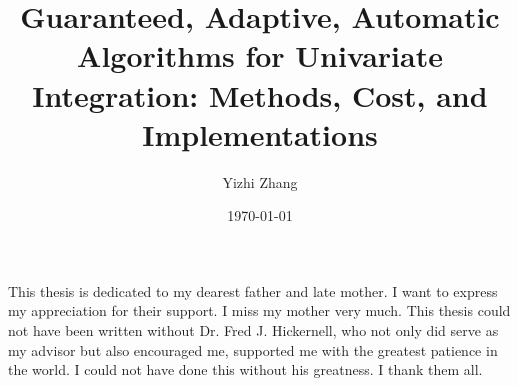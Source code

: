 \documentclass{iitthesis}
\theoremstyle{definition}
\theoremstyle{remark}
\begin{document}
\title{Guaranteed, Adaptive, Automatic Algorithms for Univariate Integration: Methods, Cost, and Implementations}
\author{Yizhi Zhang}
\date{\today}
\copyrightnoticefalse      %
\maketitle                %


\prelimpages         %


\begin{acknowledgement}     %
\par  This thesis is dedicated to my dearest father and late mother. I want to express my appreciation for their support. I miss my mother very much. This thesis could not have been written without Dr. Fred J. Hickernell, who not only did serve as my advisor but also encouraged me, supported me with the greatest patience in the world. I could not have done this without his greatness. I thank them all.
\end{acknowledgement}


\tableofcontents
\clearpage

\listoftables

\clearpage

\listoffigures

\clearpage
%
%
%
\end{document}
